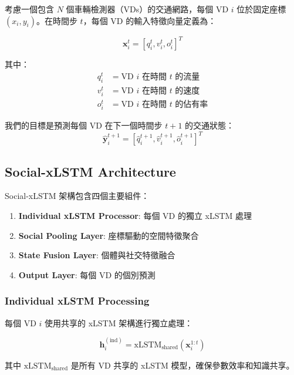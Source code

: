 \documentclass[11pt,a4paper]{article}
\begin{document}
考慮一個包含 $N$ 個車輛檢測器（VDs）的交通網路，每個 VD $i$ 位於固定座標 $(x_i, y_i)$。在時間步 $t$，每個 VD 的輸入特徵向量定義為：

\begin{equation}
\mathbf{x}_i^t = [q_i^t, v_i^t, o_i^t]^T
\end{equation}

其中：
\begin{align}
q_i^t &= \text{VD } i \text{ 在時間 } t \text{ 的流量} \\
v_i^t &= \text{VD } i \text{ 在時間 } t \text{ 的速度} \\
o_i^t &= \text{VD } i \text{ 在時間 } t \text{ 的佔有率}
\end{align}

我們的目標是預測每個 VD 在下一個時間步 $t+1$ 的交通狀態：
\begin{equation}
\hat{\mathbf{y}}_i^{t+1} = [\hat{q}_i^{t+1}, \hat{v}_i^{t+1}, \hat{o}_i^{t+1}]^T
\end{equation}

\subsection{Social-xLSTM Architecture}

Social-xLSTM 架構包含四個主要組件：

\begin{enumerate}
\item \textbf{Individual xLSTM Processor}: 每個 VD 的獨立 xLSTM 處理
\item \textbf{Social Pooling Layer}: 座標驅動的空間特徵聚合
\item \textbf{State Fusion Layer}: 個體與社交特徵融合
\item \textbf{Output Layer}: 每個 VD 的個別預測
\end{enumerate}

\subsubsection{Individual xLSTM Processing}

每個 VD $i$ 使用共享的 xLSTM 架構進行獨立處理：

\begin{equation}
\mathbf{h}_i^{(\text{ind})} = \text{xLSTM}_{\text{shared}}(\mathbf{x}_i^{1:t})
\end{equation}

其中 $\text{xLSTM}_{\text{shared}}$ 是所有 VD 共享的 xLSTM 模型，確保參數效率和知識共享。
\end{document}
